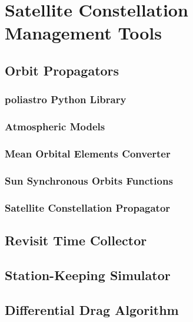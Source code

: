 \chapter{Satellite Constellation Management Tools}


\section{Orbit Propagators}

\subsection{poliastro Python Library}
\subsection{Atmospheric Models}
\subsection{Mean Orbital Elements Converter}
\subsection{Sun Synchronous Orbits Functions}
\subsection{Satellite Constellation Propagator}

\section{Revisit Time Collector}

\section{Station-Keeping Simulator}

\section{Differential Drag Algorithm}
